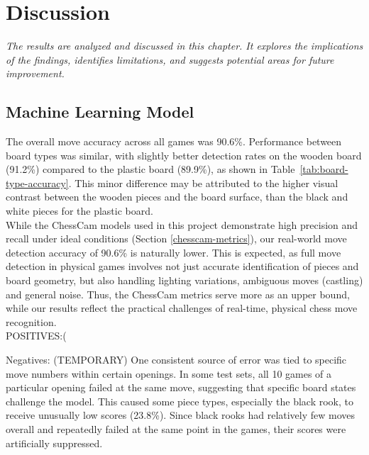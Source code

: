 \chapter{Discussion}

\begin{center}
    \textit{The results are analyzed and discussed in this chapter. It explores the implications of the findings, identifies limitations, and suggests potential areas for future improvement.}
\end{center}

\section{Machine Learning Model}

The overall move accuracy across all games was 90.6\%. Performance between board types was similar, with slightly better detection rates on the wooden board (91.2\%) compared to the plastic board (89.9\%), as shown in Table~\ref{tab:board-type-accuracy}. This minor difference may be attributed to the higher visual contrast between the wooden pieces and the board surface, than the black and white pieces for the plastic board. \\

While the ChessCam models used in this project demonstrate high precision and recall under ideal conditions (Section \ref{chesscam-metrics}), our real-world move detection accuracy of 90.6\% is naturally lower. This is expected, as full move detection in physical games involves not just accurate identification of pieces and board geometry, but also handling lighting variations, ambiguous moves (castling) and general noise. Thus, the ChessCam metrics serve more as an upper bound, while our results reflect the practical challenges of real-time, physical chess move recognition. \\


POSITIVES:(


Negatives: (TEMPORARY)
One consistent source of error was tied to specific move numbers within certain openings. In some test sets, all 10 games of a particular opening failed at the same move, suggesting that specific board states challenge the model. This caused some piece types, especially the black rook, to receive unusually low scores (23.8\%). Since black rooks had relatively few moves overall and repeatedly failed at the same point in the games, their scores were artificially suppressed. \\

